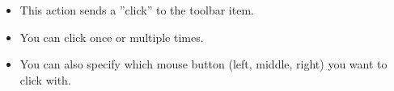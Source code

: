 
\begin{itemize}
\item This action sends a ''click''
 to the toolbar item.
\item You can click once or multiple times. 
\item You can also specify which mouse button (left, middle, right) you want to click with. 
\end{itemize}
